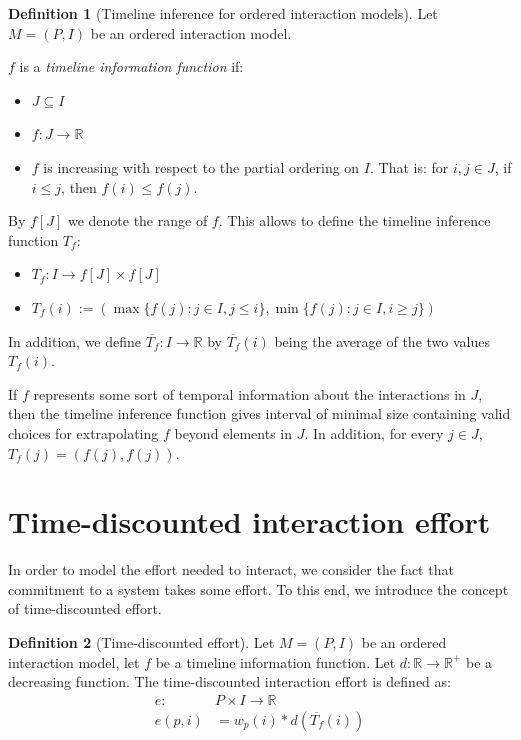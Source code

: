 \documentclass[a4paper,11pt]{book}
\newcommand{\bb}{\mathbb}
\newcommand{\ov}{\overline}
\theoremstyle{definition}
\newtheorem{definition}{Definition}
\begin{document}
\begin{definition}[Timeline inference for ordered interaction models]
    Let $M = (P, I)$ be an ordered interaction model. 

    $f$ is a \emph{timeline information function} if:
    \begin{itemize}
        \item $J \subseteq I$ 
        \item $f : J \to \bb{R}$
        \item $f$ is increasing with respect to the partial ordering on $I$. That is:
            for $i,j \in J$, if $i \leq j$, then $f(i) \leq f(j)$. 
    \end{itemize}

    By $f[J]$ we denote the range of $f$.
    This allows to define the timeline inference function $T_f$:

    \begin{itemize}
        \item $T_f : I \to f[J] \times f[J]$
        \item $T_f(i) := (\max \{f(j): j \in I, j \leq i\}, \min \{f(j) : j \in I, i \geq j\})$
    \end{itemize}
    
    In addition, we define $\ov{T_f} : I \to \bb{R}$ by $\ov{T_f}(i)$ being the average of the
    two values $T_f(i)$.
\end{definition}


If $f$ represents some sort of temporal information about the interactions in $J$, 
then the timeline inference function gives interval of minimal size containing valid choices for extrapolating
$f$ beyond elements in $J$. In addition, for every $j \in J$, $T_f(j) = (f(j), f(j))$.

\section{Time-discounted interaction effort}

In order to model the effort needed to interact, we consider the fact that commitment to
a system takes some effort. To this end, we introduce the concept of time-discounted effort.

\begin{definition}[Time-discounted effort]
    Let $M = (P, I)$ be an ordered interaction model, let $f$ be a timeline information function.
    Let $d: \bb{R} \to \bb{R}^+$ be a decreasing function. The time-discounted interaction
    effort is defined as:
    \begin{align*}
        e: & P \times I \to \bb{R} \\
        e(p, i) &= w_p(i)*d(\ov{T_f}(i)) \\
    \end{align*}
\end{definition}
\end{document}
